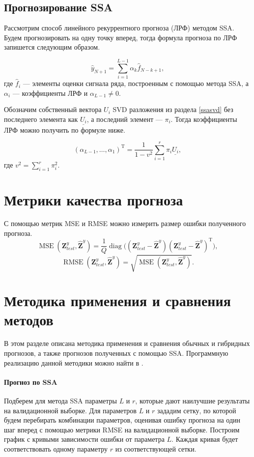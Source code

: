 \documentclass[specialist,
               substylefile = spbu.rtx,
               subf,href,colorlinks=true, 12p]{disser}
\DeclareMathOperator{\diag}{diag}
\DeclareMathOperator{\MSE}{MSE}
\DeclareMathOperator{\RMSE}{RMSE}
\begin{document}
\subsection{Прогнозирование SSA}

Рассмотрим способ линейного рекуррентного прогноза (ЛРФ) методом SSA. Будем прогнозировать на одну точку вперед, тогда формула прогноза по ЛРФ запишется следующим образом.

\begin{equation*}
	\hat{y}_{N+1} = \sum_{i = 1}^{L - 1} \alpha_k \hat{f}_{N - k + 1},
\end{equation*}
где $\hat{f}_i$ --- элементы оценки сигнала ряда, построенным с помощью метода SSA, а $\alpha_i$ --- коэффициенты ЛРФ и $\alpha_{L-1} \neq 0$.

Обозначим собственный вектора $U_i$ SVD разложения из раздела \ref{ssasvd} без последнего элемента как $\underline{U_i}$, а последний элемент --- $\pi_i$. Тогда коэффициенты ЛРФ можно получить по формуле ниже.

\begin{equation*}
	(\alpha_{L-1}, \ldots, \alpha_{1})^\mathrm{T} = \dfrac{1}{1- v^2} \sum_{i=1}^r \pi_i \underline{U_i},
\end{equation*}
где $v^2 = \sum_{i=1}^r \pi_i^2$.

\section{Метрики качества прогноза}
С помощью метрик MSE и RMSE можно измерить размер ошибки полученного прогноза.
$$ \MSE(\mathbf{Z}^y_{test}, \mathbf{\widehat{Z}}^y) = \frac{1}{Q} \diag\bigg((\mathbf{Z}^y_{test} - \mathbf{\widehat{Z}}^y) (\mathbf{Z}^y_{test} - \mathbf{\widehat{Z}}^y)^\mathrm{T}\bigg), $$
$$ \RMSE(\mathbf{Z}^y_{test}, \mathbf{\widehat{Z}}^y) = \sqrt{\MSE(\mathbf{Z}^y_{test}, \mathbf{\widehat{Z}}^y)}. $$

\section{Методика применения и сравнения методов}
\label{comp_tactic}
В этом разделе описана методика применения и сравнения обычных и гибридных прогнозов, а также прогнозов полученных с помощью SSA. Программную реализацию данной методики можно найти в \cite{Ezhov2022}.

\paragraph{Прогноз по SSA} Подберем для метода SSA параметры $L$ и $r$, которые дают наилучшие результаты на валидационной выборке. Для параметров $L$ и $r$ зададим сетку, по которой будем перебирать комбинации параметров, оценивая ошибку прогноза на один шаг вперед с помощью метрики RMSE на валидационной выборке. Построим график с кривыми зависимости ошибки от параметра $L$. Каждая кривая будет соответствовать одному параметру $r$ из соответствующей сетки.
\end{document}
